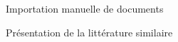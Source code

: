 \documentclass[
  letterpaper,
  DIV=11,
  numbers=noendperiod]{scrreprt}
\begin{document}
\begin{figure}


\caption{\label{fig-rr2}Importation manuelle de documents}

\end{figure}%

\begin{figure}


\caption{\label{fig-rr3}Présentation de la littérature similaire}

\end{figure}%
\end{document}
